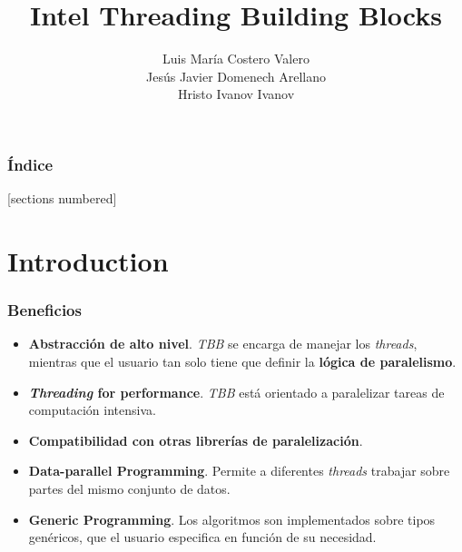 \documentclass[10pt]{beamer}
\title{Intel Threading Building Blocks}
\date{}%
\author{Luis María Costero Valero\\Jesús Javier Domenech Arellano\\Hristo
  Ivanov Ivanov}
\institute{23 Noviembre 2015}
\begin{document}
\maketitle





\begin{frame}
  \frametitle{Índice}
  [sections numbered]
  \tableofcontents[hideallsubsections]
\end{frame}

\section{Introduction} %


\begin{frame}
  \frametitle{Beneficios}
  \begin{itemize}
    \item \textbf{Abstracción de alto nivel}. \emph{TBB} se encarga de
          manejar los \emph{threads}, mientras que el usuario tan solo
          tiene que definir la \textbf{lógica de paralelismo}.
    \item \textbf{\emph{Threading} for performance}. \emph{TBB} está orientado
          a paralelizar tareas de computación intensiva.
    \item \textbf{Compatibilidad con otras librerías de paralelización}.
    \item \textbf{Data-parallel Programming}. Permite a diferentes
          \emph{threads} trabajar sobre partes del mismo conjunto de datos.
    \item \textbf{Generic Programming}. Los algoritmos son implementados
          sobre tipos genéricos, que el usuario especifica en función
          de su necesidad.
  \end{itemize}
\end{frame}
\end{document}

